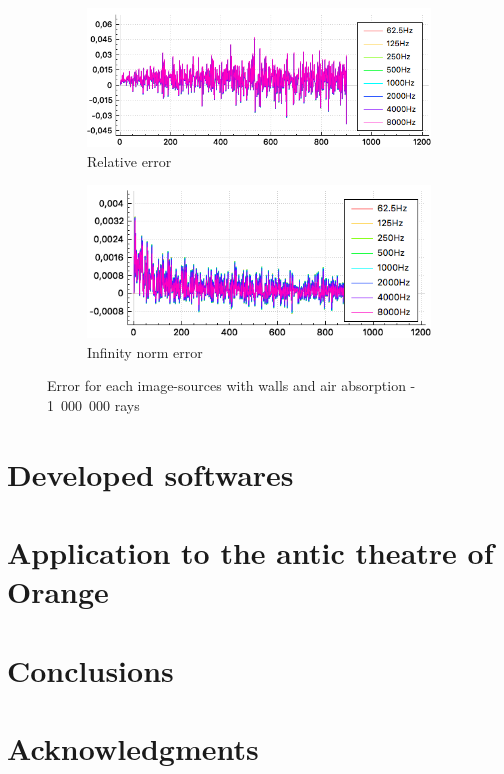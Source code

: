 \documentclass[AMA,STIX1COL]{WileyNJD-v2}
\begin{document}
\begin{figure}
\centering
	\begin{subfigure}{0.49\textwidth}
		\includegraphics[width=\linewidth]{test3_8}
		\caption{Relative error}
		\label{test3_8}
	\end{subfigure}
	\begin{subfigure}{0.49\textwidth}
		\includegraphics[width=\linewidth]{test3_9}
		\caption{Infinity norm error}
		\label{test3_9}
	\end{subfigure}
	\caption{Error for each image-sources with walls and air absorption - 1~000~000 rays}
\end{figure}


\section{Developed softwares }\label{sec6}

\section{Application to the antic theatre of Orange}\label{sec7}


\section{Conclusions}

\section*{Acknowledgments}
\end{document}
